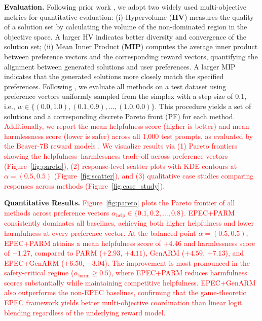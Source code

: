 \documentclass{article}
\begin{document}
\textbf{Evaluation.}
Following prior work \citep{lin2025parm}, we adopt two widely used multi-objective metrics \citep{zhang2024libmoon} for quantitative evaluation:
(i) Hypervolume (\textbf{HV}) \citep{zitzler1998multiobjective} measures the quality of a solution set by calculating the volume of the non-dominated region in the objective space. A larger HV indicates better diversity and convergence of the solution set;
(ii) Mean Inner Product (\textbf{MIP}) computes the average inner product between preference vectors and the corresponding reward vectors, quantifying the alignment between generated solutions and user preferences. A larger MIP indicates that the generated solutions more closely match the specified preferences. Following \citep{lin2025parm}, we evaluate all methods on a test dataset using preference vectors uniformly sampled from the simplex with a step size of $0.1$, i.e., $w \in \{(0.0,1.0), (0.1,0.9), \ldots, (1.0,0.0)\}$. This procedure yields a set of solutions and a corresponding discrete Pareto front (PF) for each method.
\textcolor{red}{Additionally, we report the mean helpfulness score (higher is better) and mean harmlessness score (lower is safer) across all 1{,}000 test prompts, as evaluated by the Beaver-7B reward models \citep{ji2023beavertails}. We visualize results via (1) Pareto frontiers showing the helpfulness--harmlessness trade-off across preference vectors (Figure~\ref{fig:pareto}), (2) response-level scatter plots with KDE contours at $\alpha = (0.5, 0.5)$ (Figure~\ref{fig:scatter}), and (3) qualitative case studies comparing responses across methods (Figure~\ref{fig:case_study}).}

\textbf{Quantitative Results.}
\textcolor{red}{Figure~\ref{fig:pareto} plots the Pareto frontier of all methods across preference vectors $\alpha_{\mathrm{help}} \in \{0.1, 0.2, \ldots, 0.8\}$. EPEC+PARM consistently dominates all baselines, achieving both higher helpfulness and lower harmfulness at every preference vector. At the balanced point $\alpha=(0.5, 0.5)$, EPEC+PARM attains a mean helpfulness score of $+4.46$ and harmlessness score of $-1.27$, compared to PARM ($+2.93$, $+4.11$), GenARM ($+4.59$, $+7.13$), and EPEC+GenARM ($+6.50$, $-3.04$). The improvement is most pronounced in the safety-critical regime ($\alpha_{\mathrm{harm}} \geq 0.5$), where EPEC+PARM reduces harmfulness scores substantially while maintaining competitive helpfulness. EPEC+GenARM also outperforms the non-EPEC baselines, confirming that the game-theoretic EPEC framework yields better multi-objective coordination than linear logit blending regardless of the underlying reward model.}
\end{document}
